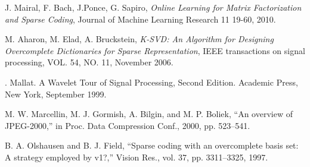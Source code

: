 \documentclass[a4paper,11pt]{article}
\begin{document}
\begin{thebibliography}{9}
  J. Mairal, F. Bach, J.Ponce, G. Sapiro,
  \emph{Online Learning for Matrix Factorization and Sparse Coding},
  Journal of Machine Learning Research 11 19-60, 2010.

  M. Aharon, M. Elad, A. Bruckstein,
  \emph{K-SVD: An Algorithm for Designing Overcomplete Dictionaries for Sparse Representation},
  IEEE transactions on signal processing, VOL. 54, NO. 11, November 2006.

. Mallat. A Wavelet Tour of Signal Processing, Second Edition. Academic Press, New York,
September 1999.


M. W. Marcellin, M. J. Gormish, A. Bilgin, and M. P. Boliek, “An
overview of JPEG-2000,” in Proc. Data Compression Conf., 2000, pp.
523–541.

B. A. Olshausen and B. J. Field, “Sparse coding with an overcomplete
basis set: A strategy employed by v1?,” Vision Res., vol. 37, pp.
3311–3325, 1997.


\end{thebibliography}
\end{document}
